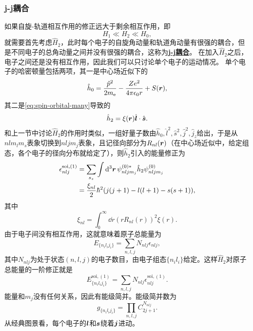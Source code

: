 \documentclass[UTF8, a4paper]{ctexart}
\newcommand*{\concept}[1]{\underline{\textbf{#1}}}
\begin{document}
\subsubsection{j-j耦合}\label{sec:jj-coupling}

如果自旋-轨道相互作用的修正远大于剩余相互作用，即
\begin{equation}
    H_1 \ll H_2 \ll H_0,
\end{equation}
就需要首先考虑$\hat{H}_2$，此时每个电子的自旋角动量和轨道角动量有很强的耦合，但是不同电子的总角动量之间并没有很强的耦合，这称为\concept{j-j耦合}。
在加入$\hat{H}_2$之后，电子之间还是没有相互作用，因此我们可以只讨论单个电子的运动情况。
单个电子的哈密顿量包括两项，其一是中心场近似下的
\[
    \hat{h}_0 = \frac{\hat{p}^2}{2m_\text{e}} - \frac{Z e^2}{4\pi \epsilon_0 r} + S(\vb*{r}),
\]
其二是\eqref{eq:spin-orbital-many}导致的
\[
    \hat{h}_2 = \xi(\vb*{r}) \hat{\vb*{l}} \cdot \hat{\vb*{s}}.
\]
和上一节中讨论$\hat{H}_2$的作用时类似，一组好量子数由$\hat{h}_0, \hat{l}^2, \hat{s}^2, \hat{j}^2, \hat{j}_z$给出，于是从$nl m_l m_s$表象切换到$nlj m_j$表象，且记径向部分为$R_{nl}(\vb*{r})$（在中心场近似中，给定组态，各个电子的径向分布就给定了），则$\hat{h}_2$引入的能量修正为
\begin{equation}
    \begin{aligned}
        \epsilon_{nlj}^{\text{soi}, (1)} &= \sum_{s_z} \int \dd[3]{\vb*{r}} \psi^{(0)*}_{nlj m_j} \hat{h}_2 \psi^{(0)}_{nlj m_j} \\
        &= \frac{\xi_{nl}}{2} \hbar^2 (j(j+1) - l(l+1) - s(s+1)),
    \end{aligned}
\end{equation}
其中
\begin{equation}
    \xi_{nl} = \int_0^\infty \dd{r} (r R_{nl}(r))^2 \xi(r).
\end{equation}
由于电子间没有相互作用，这就意味着原子总能量为
\[
    E_{\{n_i l_i j_i\}} = \sum_{n, l, j} N_{nlj} \epsilon_{nlj},
\]
其中$N_{nlj}$为处于状态$(n, l, j)$的电子数目，由电子组态$\{n_i l_i\}$给定。这样$\hat{H}_2$对原子总能量的一阶修正就是
\begin{equation}
    E^{\text{soi}, (1)}_{\{n_i l_i j_i\}} = \sum_{n, l, j} N_{nlj} \epsilon_{nlj}^{\text{soi}, (1)}.
\end{equation}
能量和$m_j$没有任何关系，因此有能级简并。能级简并数为
\begin{equation}
    g_{\{n_i l_i j_i\}} = \prod_{n, l, j} C_{2j+1}^{N_{nlj}}.
\end{equation}
从经典图景看，每个电子的$\vb*{l}$和$\vb*{s}$绕着$\vb*{j}$进动。
\end{document}
